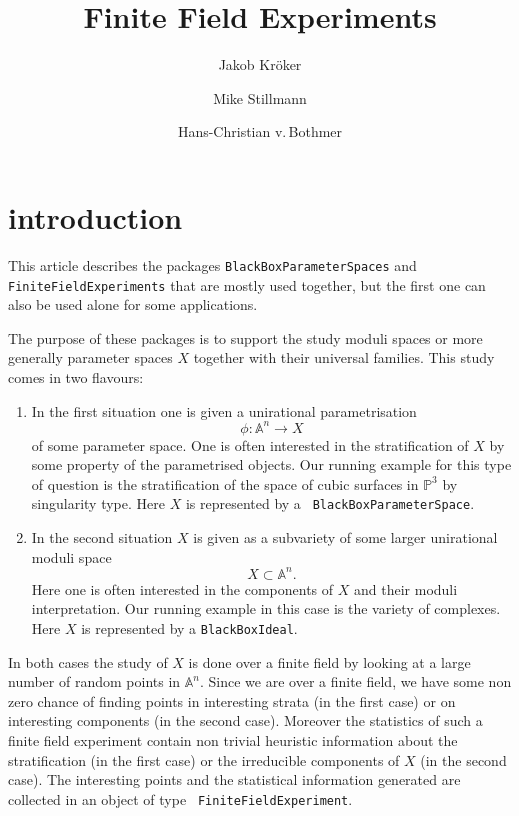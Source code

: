 \documentclass[12pt,a4paper]{amsart}
\theoremstyle{plain}
\theoremstyle{definition}
\renewcommand{\AA}{\mathbb A}
\newcommand{\PP}{\mathbb P}
\begin{document}
\title{Finite Field Experiments}

\author{Jakob Kr\"oker}
\author{Mike Stillmann}
\author{Hans-Christian v.\,Bothmer}

\maketitle

\section{introduction}

This article describes the packages {\tt BlackBoxParameterSpaces} and
{\tt FiniteFieldExperiments} that are mostly used together, but the
first one can also be used alone for some applications.

The purpose of these packages is to support the study moduli spaces or more
generally parameter spaces $X$ together with their universal
families. This study comes in two flavours:

\begin{enumerate}
\item In the first situation one is given a unirational parametrisation 
\[
	\phi \colon \AA^n \to X
\]
of some parameter space.  One is often interested in
the stratification of $X$ by some property of the parametrised
objects. Our running example for this type of question is the
stratification of the space of cubic surfaces in $\PP^3$ by
singularity type. Here $X$ is represented by a {\tt
  BlackBoxParameterSpace}.

\item In the second situation $X$ is given as a subvariety of some larger unirational moduli space
\[
	X \subset \AA^n.
\]
Here one is often interested in the components of $X$ and their moduli
interpretation. Our running example in this case is the variety of
complexes. Here $X$ is represented by a {\tt BlackBoxIdeal}.
\end{enumerate}

In both cases the study of $X$ is done over a finite field by looking
at a large number of random points in $\AA^n$. Since we are over a
finite field, we have some non zero chance of finding points in
interesting strata (in the first case) or on interesting components
(in the second case). Moreover the statistics of such a finite field
experiment contain non trivial heuristic information about the
stratification (in the first case) or the irreducible components of
$X$ (in the second case). The interesting points and the statistical
information generated are collected in an object of type {\tt
  FiniteFieldExperiment}.
\end{document}
